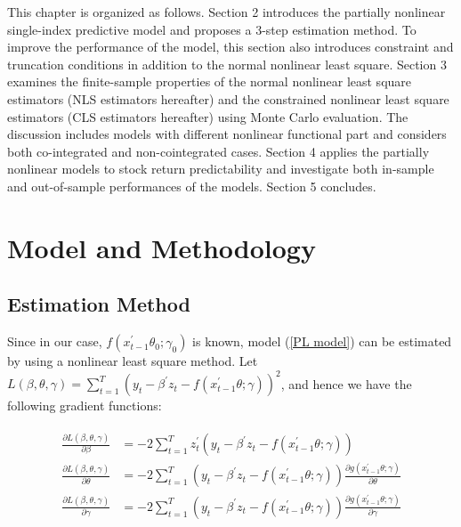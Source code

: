 \documentclass[a4paper,12pt,times,numbered,print,index]{report}
\numberwithin{equation}{section}
\begin{document}
This chapter is organized as follows. Section 2 introduces the partially nonlinear single-index predictive model and proposes a 3-step estimation method. To improve the performance of the model, this section also introduces constraint and truncation conditions in addition to the normal nonlinear least square. Section 3 examines the finite-sample properties of the normal nonlinear least square estimators (NLS estimators hereafter) and the constrained nonlinear least square estimators (CLS estimators hereafter) using Monte Carlo evaluation. The discussion includes models with different nonlinear functional part and considers both co-integrated and non-cointegrated cases. Section 4 applies the partially nonlinear models to stock return predictability and investigate both in-sample and out-of-sample performances of the models. Section 5 concludes. 

%
\section{Model and Methodology}
\subsection{Estimation Method}
Since in our case, $f\left( x_{t-1}^{\prime }\theta_0; \gamma_0\right)$ is known, model (\ref{PL model}) can be estimated by using a nonlinear least square method. Let $L(\beta, \theta, \gamma) = \sum_{t=1}^{T} \left( y_t - \beta^{\prime} z_t - f\left( x_{t-1}^{\prime }\theta; \gamma\right)\right) ^2$, and hence we have the following gradient functions:


\begin{align}
	\begin{split}
	\frac{\partial L(\beta, \theta, \gamma)}{\partial \beta} &= -2\sum_{t=1}^{T} z_t^{\prime} \left( y_t - \beta^{\prime} z_t - f\left( x_{t-1}^{\prime }\theta; \gamma\right)\right) \\
	\frac{\partial L(\beta, \theta, \gamma)}{\partial \theta} &= -2\sum_{t=1}^{T} \left( y_t - \beta^{\prime} z_t - f\left( x_{t-1}^{\prime }\theta; \gamma\right)\right)\frac{\partial g(x_{t-1}^{\prime }\theta; \gamma)}{\partial \theta} \\
	\frac{\partial L(\beta, \theta, \gamma)}{\partial \gamma} &= -2\sum_{t=1}^{T} \left( y_t - \beta^{\prime} z_t - f\left( x_{t-1}^{\prime }\theta; \gamma\right)\right) \frac{\partial g(x_{t-1}^{\prime }\theta; \gamma)}{\partial \gamma}
	\end{split}
	\label{gradient}
\end{align}
\end{document}
